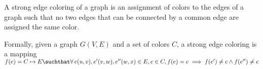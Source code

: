 \begin{defi}

A strong edge coloring of a graph is an assignment of colors to the edges of a graph such that no two edges that can be connected by a common edge are assigned the same color. 

Formally, given a graph $G(V,E)$ and a set of colors $C$, a strong edge coloring is a mapping $f(e) = C \mapsto E \suchthat \forall\, e(u,v), e'(v,w), e''(w,x) \in E, c \in C, f(e) = c \implies f(e') \ne c \wedge f(e'') \ne c$ 
\end{defi}

